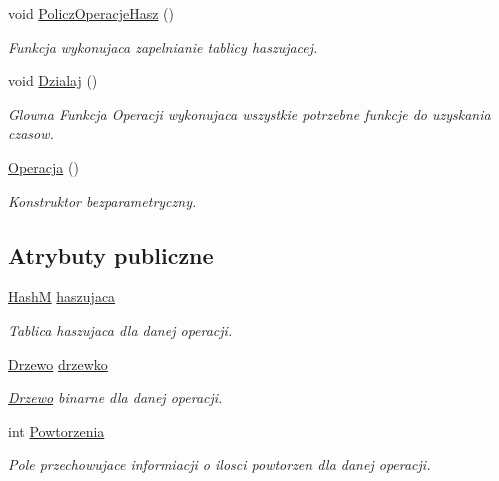 \begin{DoxyCompactItemize}
void \hyperlink{class_operacja_a97f0315ebc8d718a497415023ef11564}{Policz\-Operacje\-Hasz} ()
\begin{DoxyCompactList}\small\item\em Funkcja wykonujaca zapelnianie tablicy haszujacej. \end{DoxyCompactList}\item 
void \hyperlink{class_operacja_add48398ebfeae90a0d1b58a31962fd7d}{Dzialaj} ()
\begin{DoxyCompactList}\small\item\em Glowna Funkcja Operacji wykonujaca wszystkie potrzebne funkcje do uzyskania czasow. \end{DoxyCompactList}\item 
\hyperlink{class_operacja_a1624fb5817c0b60e1680509fc4517732}{Operacja} ()
\begin{DoxyCompactList}\small\item\em Konstruktor bezparametryczny. \end{DoxyCompactList}\end{DoxyCompactItemize}
\subsection*{Atrybuty publiczne}
\begin{DoxyCompactItemize}
\item 
\hyperlink{class_hash_m}{Hash\-M} \hyperlink{class_operacja_ad67a2aa20b71ec0e1f1cff12b7220b6a}{haszujaca}
\begin{DoxyCompactList}\small\item\em Tablica haszujaca dla danej operacji. \end{DoxyCompactList}\item 
\hyperlink{class_drzewo}{Drzewo} \hyperlink{class_operacja_a814e223e988958ccbbe66aef89054da3}{drzewko}
\begin{DoxyCompactList}\small\item\em \hyperlink{class_drzewo}{Drzewo} binarne dla danej operacji. \end{DoxyCompactList}\item 
int \hyperlink{class_operacja_aa568b17d05f31132b3d97eb5b7e93d61}{Powtorzenia}
\begin{DoxyCompactList}\small\item\em Pole przechowujace informiacji o ilosci powtorzen dla danej operacji. \end{DoxyCompactList}\end{DoxyCompactItemize}


